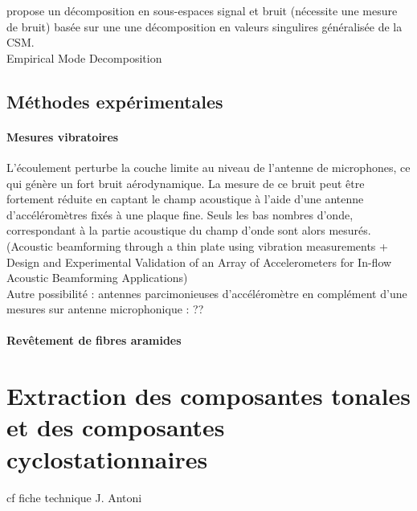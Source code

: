 \cite{Bulte2007} propose un décomposition en sous-espaces signal et bruit (nécessite une mesure de bruit) basée sur une une décomposition en valeurs singulires généralisée de la CSM.\\
Empirical Mode Decomposition\\









\subsection{Méthodes expérimentales}

\paragraph{\tbullet Mesures vibratoires} L'écoulement perturbe la couche limite au niveau de l'antenne de microphones, ce qui génère un fort bruit aérodynamique. La mesure de ce bruit peut être fortement réduite en captant le champ acoustique à l'aide d'une antenne d'accéléromètres fixés à une plaque fine. Seuls les bas nombres d'onde, correspondant à la partie acoustique du champ d'onde sont alors mesurés. (Acoustic beamforming through a thin plate using vibration measurements  +   Design and Experimental Validation of an Array of Accelerometers for In-flow Acoustic Beamforming Applications) \\

Autre possibilité : antennes parcimonieuses d'accéléromètre en complément d'une mesures sur antenne microphonique : ??\\

\paragraph{\tbullet Revêtement de fibres aramides}


\section{Extraction des composantes tonales et des composantes cyclostationnaires}
cf fiche technique J. Antoni

